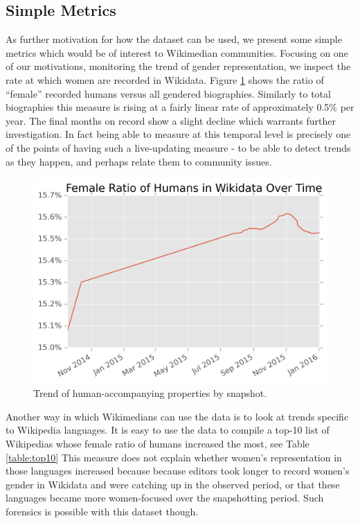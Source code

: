 \documentclass[letterpaper]{article}
\begin{document}
\subsection{Simple Metrics}
As further motivation for how the dataset can be used, we present some simple metrics which would be of interest to Wikimedian communities. Focusing on one of our motivations, monitoring the trend of gender representation, we inspect the rate at which women are recorded in Wikidata. Figure \ref{fig:frb} shows the ratio of ``female'' recorded humans versus all gendered biographies. Similarly to total biographies this measure is rising at a fairly linear rate of approximately 0.5\% per year. The final months on record show a slight decline which warrants further investigation. In fact being able to measure at this temporal level is precisely one of the points of having such a live-updating measure - to be able to detect trends as they happen, and perhaps relate them to community issues. 

\begin{figure}
\label{fig:frb}
\includegraphics[scale=0.6]{figures/frbwikidata.png} 
\caption{Trend of human-accompanying properties by snapshot.}
\end{figure}

Another way in which Wikimedians can use the data is to look at trends specific to Wikipedia languages. It is easy to use the data to compile a top-10 list of Wikipedias whose female ratio of humans increased the most, see Table \ref{table:top10} This measure does not explain whether women's representation in those languages increased because because editors took longer to record women's gender in Wikidata and were catching up in the observed period, or that these languages became more women-focused over the snapshotting period. Such forensics is possible with this dataset though.
\end{document}
